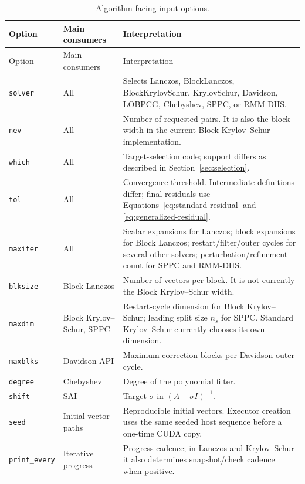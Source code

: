 \documentclass[11pt]{article}
\newcommand{\code}[1]{\texttt{#1}}
\begin{document}
\small
\begin{longtable}{P{0.17\textwidth} P{0.24\textwidth} P{0.49\textwidth}}
\caption{Algorithm-facing input options.}
\label{tab:parameters}\\
\toprule
Option & Main consumers & Interpretation \\
\midrule
\endfirsthead
\toprule
Option & Main consumers & Interpretation \\
\midrule
\endhead
\code{solver} & All & Selects Lanczos, BlockLanczos, BlockKrylovSchur, KrylovSchur, Davidson, LOBPCG, Chebyshev, SPPC, or RMM-DIIS. \\
\code{nev} & All & Number of requested pairs. It is also the block width in the current Block Krylov--Schur implementation. \\
\code{which} & All & Target-selection code; support differs as described in Section~\ref{sec:selection}. \\
\code{tol} & All & Convergence threshold. Intermediate definitions differ; final residuals use Equations~\eqref{eq:standard-residual} and \eqref{eq:generalized-residual}. \\
\code{maxiter} & All & Scalar expansions for Lanczos; block expansions for Block Lanczos; restart/filter/outer cycles for several other solvers; perturbation/refinement count for SPPC and RMM-DIIS. \\
\code{blksize} & Block Lanczos & Number of vectors per block. It is not currently the Block Krylov--Schur width. \\
\code{maxdim} & Block Krylov--Schur, SPPC & Restart-cycle dimension for Block Krylov--Schur; leading split size $n_s$ for SPPC. Standard Krylov--Schur currently chooses its own dimension. \\
\code{maxblks} & Davidson API & Maximum correction blocks per Davidson outer cycle. \\
\code{degree} & Chebyshev & Degree of the polynomial filter. \\
\code{shift} & SAI & Target $\sigma$ in $(A-\sigma I)^{-1}$. \\
\code{seed} & Initial-vector paths & Reproducible initial vectors. Executor creation uses the same seeded host sequence before a one-time CUDA copy. \\
\code{print\_every} & Iterative progress & Progress cadence; in Lanczos and Krylov--Schur it also determines snapshot/check cadence when positive. \\
\bottomrule
\end{longtable}
\normalsize
\end{document}
